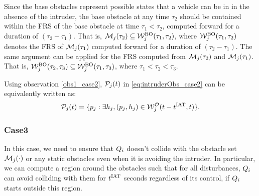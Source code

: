 \begin{observation} \label{obs1_case2}
Since the base obstacles represent possible states that a vehicle can be in in the absence of the intruder, the base obstacle at any time $\tau_2$ should be contained within the FRS of the base obstacle at time $\tau_1 < \tau_2$, computed forward for a duration of $(\tau_2-\tau_1).$ That is, $\mathcal{M}_j(\tau_2) \subseteq \mathcal{W}_{j}^{\text{BO}}(\tau_1, \tau_2)$, where $\mathcal{W}_{j}^{\text{BO}}(\tau_1, \tau_2)$ denotes the FRS of $\mathcal{M}_j(\tau_1)$ computed forward for a duration of $(\tau_2-\tau_1)$. The same argument can be applied for the FRS computed from $\mathcal{M}_j(\tau_2)$ and $\mathcal{M}_j(\tau_1)$. That is, $\mathcal{W}_{j}^{\text{BO}}(\tau_2, \tau_3) \subseteq \mathcal{W}_{j}^{\text{BO}}(\tau_1, \tau_3)$, where $\tau_1 < \tau_2 < \tau_3$.
\end{observation}

Using observation \ref{obs1_case2}, $\mathcal{P}_j(t)$ in \eqref{eq:intruderObs_case2} can be equivalently written as:
\begin{equation} \label{eq:intruderObs_case2_inter}
\pfrs_j(t) = \{p_j: \exists \npos_j, (p_j, \npos_j) \in \frs_{j}^{\mathcal{O}}(t-\iat, t) \}.
\end{equation}

\subsubsection{Case3} \label{sec:intruderObs_case3}
In this case, we need to ensure that $Q_i$ doesn't collide with the obstacle set $\mathcal{M}_j(\cdot)$ or any static obstacles even when it is avoiding the intruder. In particular, we can compute a region around the obstacles such that for all disturbances, $Q_i$ can avoid colliding with them for $t^\text{IAT}$ seconds regardless of its control, if $Q_i$ starts outside this region. 

